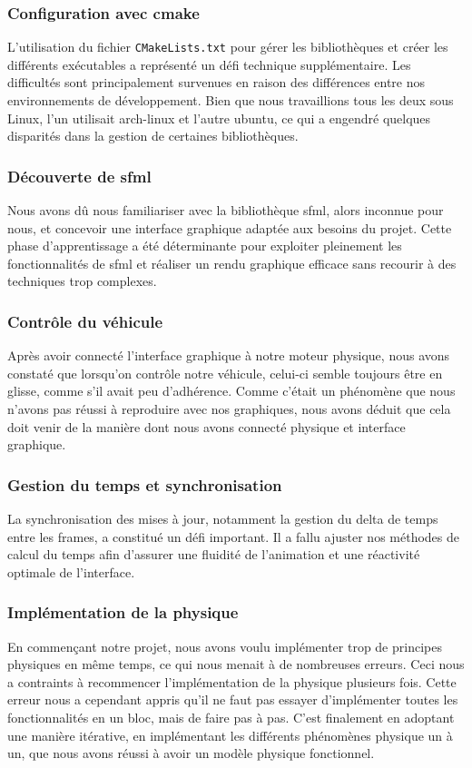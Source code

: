\subsubsection{Configuration avec \gls{cmake}}\label{subsubsec:cmake}
L'utilisation du fichier \texttt{CMakeLists.txt} pour gérer les bibliothèques et créer les différents exécutables a représenté un défi technique supplémentaire.
Les difficultés sont principalement survenues en raison des différences entre nos environnements de développement.
Bien que nous travaillions tous les deux sous Linux, l'un utilisait \gls{arch-linux} et l'autre \gls{ubuntu}, ce qui a engendré quelques disparités dans la gestion de certaines bibliothèques.

\subsubsection{Découverte de \gls{sfml}}\label{subsubsec:sfml}
Nous avons dû nous familiariser avec la bibliothèque \gls{sfml}, alors inconnue pour nous, et concevoir une interface graphique adaptée aux besoins du projet.
Cette phase d'apprentissage a été déterminante pour exploiter pleinement les fonctionnalités de \gls{sfml} et réaliser un rendu graphique efficace sans recourir à des techniques trop complexes.

\subsubsection{Contrôle du véhicule}\label{subsubsec:ctrlVehicule}
Après avoir connecté l'interface graphique à notre moteur physique, nous avons constaté que lorsqu'on contrôle notre véhicule, celui-ci semble toujours être en glisse, comme s'il avait peu d'adhérence.
Comme c'était un phénomène que nous n'avons pas réussi à reproduire avec nos graphiques, nous avons déduit que cela doit venir de la manière dont nous avons connecté physique et interface graphique.

\subsubsection{Gestion du temps et synchronisation}\label{subsubsec:la-gestion-du-temps}
La synchronisation des mises à jour, notamment la gestion du delta de temps entre les frames, a constitué un défi important.
Il a fallu ajuster nos méthodes de calcul du temps afin d’assurer une fluidité de l’animation et une réactivité optimale de l’interface.

\subsubsection{Implémentation de la physique}\label{subsubsec:implem-phys}
En commençant notre projet, nous avons voulu implémenter trop de principes physiques en même temps, ce qui nous menait à de nombreuses erreurs.
Ceci nous a contraints à recommencer l'implémentation de la physique plusieurs fois.
Cette erreur nous a cependant appris qu'il ne faut pas essayer d'implémenter toutes les fonctionnalités en un bloc, mais de faire pas à pas.
C'est finalement en adoptant une manière itérative, en implémentant les différents phénomènes physique un à un, que nous avons réussi à avoir un modèle physique fonctionnel.

